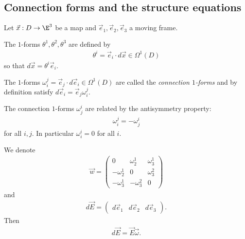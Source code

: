 \documentclass{article}
\begin{document}
\subsection{Connection forms and the structure equations}

Let $\vec x : D \to \E^3$ be a map and $\vec e_1,\vec e_2,\vec e_3$ a moving frame.

\begin{definition}
    The $1$-forms $\theta^1,\theta^2,\theta^3$ are defined by
    \begin{align*}
        \theta^i = \vec e_i \cdot d\vec x \in \Omega^1(D)
    \end{align*}
    so that $d\vec x = \theta^i\vec e_i$.
\end{definition}

\begin{definition}
    The $1$-forms $\omega_i^j=\vec e_j\cdot d\vec e_i\in\Omega^1(D)$ are called the
    \emph{connection $1$-forms} and by definition satisfy $d\vec e_i = \vec e_j\omega_i^j$.
\end{definition}

\begin{proposition}
    The connection $1$-forms $\omega_j^i$ are related by the antisymmetry property:
    \begin{align*}
        \omega_i^j = -\omega_j^i
    \end{align*}
    for all $i,j$. In particular $\omega_i^i = 0$ for all $i$.
\end{proposition}

\begin{lemma}
    We denote
    \begin{align*}
        \vec w = \begin{pmatrix}
            0           & \omega_2^1  & \omega_3^1 \\
            -\omega_2^1 & 0           & \omega_3^2 \\
            -\omega_3^1 & -\omega_3^2 & 0
        \end{pmatrix}
    \end{align*}
    and
    \begin{align*}
        d\vec E = \begin{pmatrix}
            d\vec e_1 & d\vec e_2 & d\vec e_3
        \end{pmatrix}.
    \end{align*}
    Then
    \begin{align*}
        d\vec E = \vec E\vec\omega.
    \end{align*}
\end{lemma}
\end{document}
